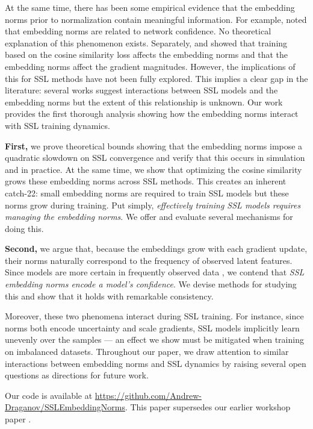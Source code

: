 At the same time, there has been some empirical evidence that the embedding norms prior to normalization contain meaningful information. For example, \citet{embed_norm_confidence_2} noted that embedding norms are related to network confidence. No theoretical explanation of this phenomenon exists. Separately, \citet{spherical_embeddings} and \citet{normface} showed that training based on the cosine similarity loss affects the embedding norms and that the embedding norms affect the gradient magnitudes. However, the implications of this for SSL methods have not been fully explored. This implies a clear gap in the literature: several works suggest interactions between SSL models and the embedding norms but the extent of this relationship is unknown. Our work provides the first thorough analysis showing how the embedding norms interact with SSL training dynamics.

\textbf{First,} we prove theoretical bounds showing that the embedding norms impose a quadratic slowdown on SSL convergence and verify that this occurs in simulation and in practice. At the same time, we show that optimizing the cosine similarity grows these embedding norms across SSL methods. This creates an inherent catch-22: small embedding norms are required to train SSL models but these norms grow during training. Put simply, \emph{effectively training SSL models requires managing the embedding norms}. We offer and evaluate several mechanisms for doing this.

\textbf{Second,} we argue that, because the embeddings grow with each gradient update, their norms naturally correspond to the frequency of observed latent features. Since models are more certain in frequently observed data \cite{long_tail_confidence}, we contend that \emph{SSL embedding norms encode a model's confidence}. We devise methods for studying this and show that it holds with remarkable consistency.

Moreover, these two phenomena interact during SSL training. For instance, since norms both encode uncertainty and scale gradients, SSL models implicitly learn unevenly over the samples --- an effect we show must be mitigated when training on imbalanced datasets. Throughout our paper, we draw attention to similar interactions between embedding norms and SSL dynamics by raising several open questions as directions for future work. 

Our code is available at \url{https://github.com/Andrew-Draganov/SSLEmbeddingNorms}. This paper supersedes our earlier workshop paper \cite{pitfalls}.